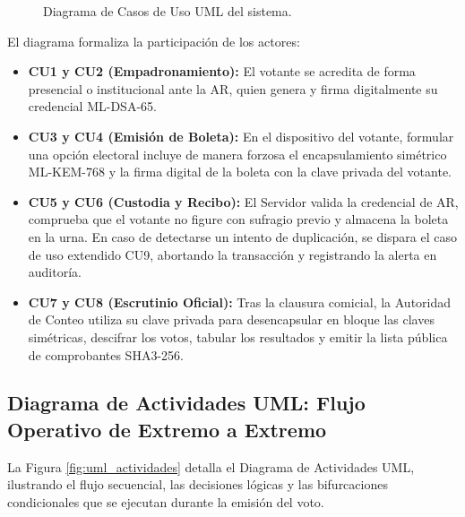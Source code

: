 \begin{figure}[htbp]
	\caption{Diagrama de Casos de Uso UML del sistema.}
	\label{fig:uml_casos_uso}
	\par{}
\end{figure}

El diagrama formaliza la participación de los actores:
\begin{itemize}
	\item \textbf{CU1 y CU2 (Empadronamiento):} El votante se acredita de forma presencial o institucional ante la AR, quien genera y firma digitalmente su credencial ML-DSA-65.
	\item \textbf{CU3 y CU4 (Emisión de Boleta):} En el dispositivo del votante, formular una opción electoral incluye de manera forzosa el encapsulamiento simétrico ML-KEM-768 y la firma digital de la boleta con la clave privada del votante.
	\item \textbf{CU5 y CU6 (Custodia y Recibo):} El Servidor valida la credencial de AR, comprueba que el votante no figure con sufragio previo y almacena la boleta en la urna. En caso de detectarse un intento de duplicación, se dispara el caso de uso extendido CU9, abortando la transacción y registrando la alerta en auditoría.
	\item \textbf{CU7 y CU8 (Escrutinio Oficial):} Tras la clausura comicial, la Autoridad de Conteo utiliza su clave privada para desencapsular en bloque las claves simétricas, descifrar los votos, tabular los resultados y emitir la lista pública de comprobantes SHA3-256.
\end{itemize}

\subsection{Diagrama de Actividades UML: Flujo Operativo de Extremo a Extremo}

La Figura \ref{fig:uml_actividades} detalla el Diagrama de Actividades UML, ilustrando el flujo secuencial, las decisiones lógicas y las bifurcaciones condicionales que se ejecutan durante la emisión del voto.

